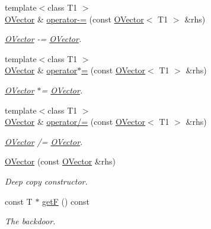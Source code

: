 \begin{DoxyCompactItemize}
{\footnotesize template$<$class T1 $>$ }\\\mbox{\hyperlink{classENSEM_1_1OVector}{O\+Vector}} \& \mbox{\hyperlink{classENSEM_1_1OVector_ae8a6c2f30368c6713325d05065aec425}{operator-\/=}} (const \mbox{\hyperlink{classENSEM_1_1OVector}{O\+Vector}}$<$ T1 $>$ \&rhs)
\begin{DoxyCompactList}\small\item\em \mbox{\hyperlink{classENSEM_1_1OVector}{O\+Vector}} -\/= \mbox{\hyperlink{classENSEM_1_1OVector}{O\+Vector}}. \end{DoxyCompactList}\item 
{\footnotesize template$<$class T1 $>$ }\\\mbox{\hyperlink{classENSEM_1_1OVector}{O\+Vector}} \& \mbox{\hyperlink{classENSEM_1_1OVector_ab1d7773b4a23e20961ece98c90b915b4}{operator$\ast$=}} (const \mbox{\hyperlink{classENSEM_1_1OVector}{O\+Vector}}$<$ T1 $>$ \&rhs)
\begin{DoxyCompactList}\small\item\em \mbox{\hyperlink{classENSEM_1_1OVector}{O\+Vector}} $\ast$= \mbox{\hyperlink{classENSEM_1_1OVector}{O\+Vector}}. \end{DoxyCompactList}\item 
{\footnotesize template$<$class T1 $>$ }\\\mbox{\hyperlink{classENSEM_1_1OVector}{O\+Vector}} \& \mbox{\hyperlink{classENSEM_1_1OVector_a61d1911393adf46629dd493ef09c1022}{operator/=}} (const \mbox{\hyperlink{classENSEM_1_1OVector}{O\+Vector}}$<$ T1 $>$ \&rhs)
\begin{DoxyCompactList}\small\item\em \mbox{\hyperlink{classENSEM_1_1OVector}{O\+Vector}} /= \mbox{\hyperlink{classENSEM_1_1OVector}{O\+Vector}}. \end{DoxyCompactList}\item 
\mbox{\hyperlink{classENSEM_1_1OVector_a10129359c78668211e551f3b13829208}{O\+Vector}} (const \mbox{\hyperlink{classENSEM_1_1OVector}{O\+Vector}} \&rhs)
\begin{DoxyCompactList}\small\item\em Deep copy constructor. \end{DoxyCompactList}\item 
const T $\ast$ \mbox{\hyperlink{classENSEM_1_1OVector_ab4767b83741c029b996a49662c021f88}{getF}} () const
\begin{DoxyCompactList}\small\item\em The backdoor. \end{DoxyCompactList}\item 

\end{DoxyCompactItemize}
